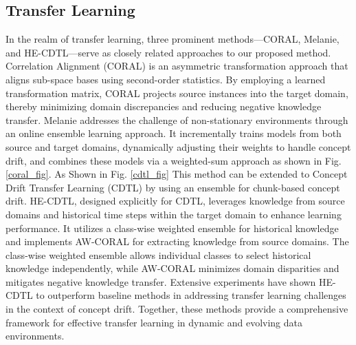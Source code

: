 \subsection{Transfer Learning}
\label{sec:3_6_2_related_work_transfer}

In the realm of transfer learning, three prominent methods—CORAL, Melanie, and HE-CDTL—serve as closely related approaches to our proposed method. Correlation Alignment (CORAL) is an asymmetric transformation approach that aligns sub-space bases using second-order statistics. By employing a learned transformation matrix, CORAL projects source instances into the target domain, thereby minimizing domain discrepancies and reducing negative knowledge transfer. Melanie addresses the challenge of non-stationary environments through an online ensemble learning approach. It incrementally trains models from both source and target domains, dynamically adjusting their weights to handle concept drift, and combines these models via a weighted-sum approach as shown in Fig. \ref{coral_fig}. As Shown in Fig. \ref{cdtl_fig} This method can be extended to Concept Drift Transfer Learning (CDTL) by using an ensemble for chunk-based concept drift. HE-CDTL, designed explicitly for CDTL, leverages knowledge from source domains and historical time steps within the target domain to enhance learning performance. It utilizes a class-wise weighted ensemble for historical knowledge and implements AW-CORAL for extracting knowledge from source domains. The class-wise weighted ensemble allows individual classes to select historical knowledge independently, while AW-CORAL minimizes domain disparities and mitigates negative knowledge transfer. Extensive experiments have shown HE-CDTL to outperform baseline methods in addressing transfer learning challenges in the context of concept drift. Together, these methods provide a comprehensive framework for effective transfer learning in dynamic and evolving data environments.

